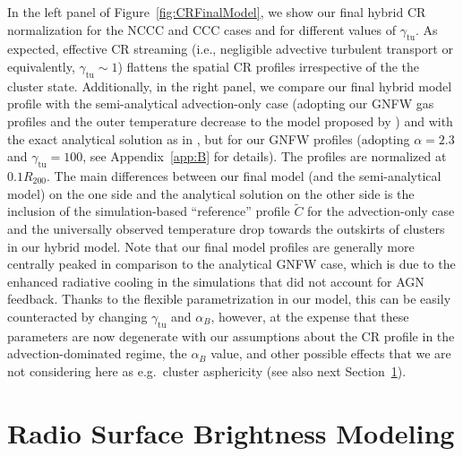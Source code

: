 \documentclass[traditabstract]{aa}
\newcommand{\rmn}{\mathrm}
\begin{document}
In the left panel of Figure~\ref{fig:CRFinalModel}, we show our final hybrid CR 
normalization for the NCCC and CCC cases and for different values of $\gamma_{\rmn{tu}}$. 
As expected, effective CR streaming (i.e., negligible advective turbulent transport
or equivalently, $\gamma_{\rmn{tu}}\sim1$) flattens the spatial CR profiles
irrespective of the the cluster state. Additionally, in the right panel, we
compare our final hybrid model profile with the
semi-analytical advection-only case (adopting our GNFW gas profiles and the
outer temperature decrease to the model proposed by \citealp{2010MNRAS.409..449P})
and with the exact analytical solution as in \citet{2011A&A...527A..99E}, but
for our GNFW profiles (adopting $\alpha=2.3$ and $\gamma_{\rmn{tu}}=100$, see
Appendix~\ref{app:B} for details).  The profiles are normalized at $0.1 R_{200}$. 
The main differences between our final model (and the semi-analytical
model) on the one side and the analytical solution on the other side is the
inclusion of the simulation-based ``reference'' profile $\tilde{C}$ for the
advection-only case and the universally observed temperature drop towards the
outskirts of clusters in our hybrid model. Note that our final model profiles
are generally more centrally peaked in comparison to the analytical GNFW case,
which is due to the enhanced radiative cooling in the \citet{2010MNRAS.409..449P} 
simulations that did not account for AGN feedback. Thanks to the
flexible parametrization in our model, this can be easily counteracted by
changing $\gamma_{\rmn{tu}}$ and $\alpha_B$, however, at the expense that these
parameters are now degenerate with our assumptions about the CR profile in the
advection-dominated regime, the $\alpha_B$ value, and other possible effects
that we are not considering here as e.g.~cluster asphericity (see also next
Section~\ref{sec:3}).


\section{Radio Surface Brightness Modeling}
\label{sec:3}
\end{document}
